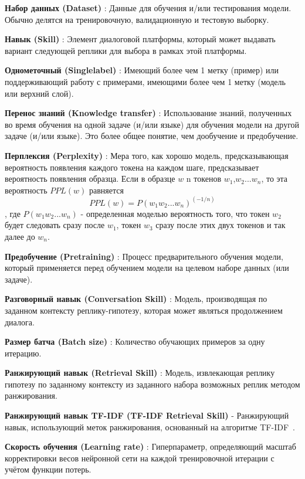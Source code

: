 \textbf{Набор данных (Dataset)} : Данные для обучения и/или тестирования модели. Обычно делятся на тренировочную, валидационную и тестовую выборку. 

\textbf{Навык (Skill)} : Элемент диалоговой платформы, который может выдавать вариант следующей реплики для выбора в рамках этой платформы. 

\textbf{Однометочный (Singlelabel)} : Имеющий более чем 1 метку (пример) или поддерживающий работу с примерами, имеющими более чем 1 метку (модель или верхний слой).

\textbf{Перенос знаний (Knowledge transfer)} : Использование знаний, полученных во время обучения на одной задаче (и/или языке) для обучения модели на другой задаче (и/или языке). Это более общее понятие, чем дообучение и предобучение.

\textbf{Перплексия (Perplexity)} : Мера того, как хорошо модель, предсказывающая вероятность появления каждого токена на каждом шаге, предсказывает вероятность появления образца. Если в образце $w$ n токенов $w_1$,$w_2$...$w_n$, то эта вероятность $PPL(w)$ равняется
\begin{equation} 
PPL(w) = P(w_1w_2... w_n)^{(-1/n)}
\end{equation},
где $P(w_1w_2... w_n)$ - определенная моделью вероятность того, что токен $w_2$ будет следовать сразу после $w_1$, токен $w_3$ сразу после этих двух токенов и так далее до $w_n$. 

\textbf{Предобучение (Pretraining)} : Процесс предварительного обучения модели, который
применяется перед обучением модели на целевом наборе данных (или задаче). 

\textbf{Разговорный навык (Conversation Skill)} : Модель, производящая по заданном контексту реплику-гипотезу, которая может являться продолжением диалога.

\textbf{Размер батча (Batch size)} : Количество обучающих примеров за одну итерацию.

\textbf{Ранжирующий навык (Retrieval Skill)} : Модель, извлекающая реплику гипотезу по заданному контексту из заданного набора возможных реплик методом ранжирования.

\textbf{Ранжирующий навык TF-IDF (TF-IDF Retrieval Skill)} - Ранжирующий навык, использующий меток ранжирования, основанный на алгоритме TF-IDF~\cite{tfidf}. 

\textbf{Скорость обучения (Learning rate)} : Гиперпараметр, определяющий масштаб корректировки весов нейронной сети на каждой тренировочной итерации с учётом функции потерь.

